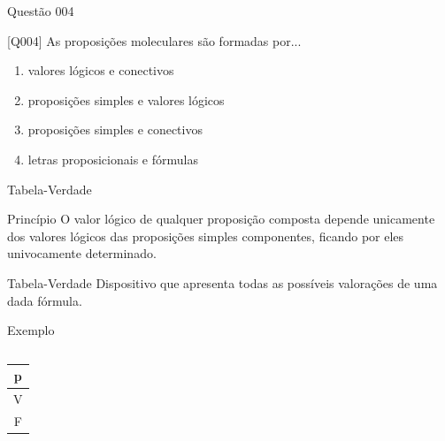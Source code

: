 \documentclass[xcolor=dvipsnames,table]{beamer}
\begin{document}
	\begin{frame}{Questão 004}		
		\begin{block}{[Q004]}
			As proposições moleculares são formadas por... 
		\end{block}
		\begin{enumerate}[label=(\Alph*)]
			\item valores lógicos e conectivos
			\item proposições simples e valores lógicos
			\item proposições simples e conectivos
			\item letras proposicionais e fórmulas
		\end{enumerate}
	\end{frame}

	\begin{frame}{Tabela-Verdade}
		\begin{block}{Princípio}
			O valor lógico de qualquer proposição composta depende unicamente dos valores lógicos das proposições simples componentes, ficando por eles univocamente determinado.
		\end{block} \pause
		\begin{block}{Tabela-Verdade}
			Dispositivo que apresenta todas as possíveis valorações de uma dada fórmula.
		\end{block} \pause
		\begin{exampleblock}{Exemplo}
			\begin{columns}
				\begin{center}
					\begin{tabular}{|c|}
						\hline
						p	\\
						\hline
						V	\\
						F	\\
						\hline
					\end{tabular}
				\end{center}
					\begin{center}
					\end{center}
			\end{columns}			
		\end{exampleblock}
	\end{frame}
\end{document}
